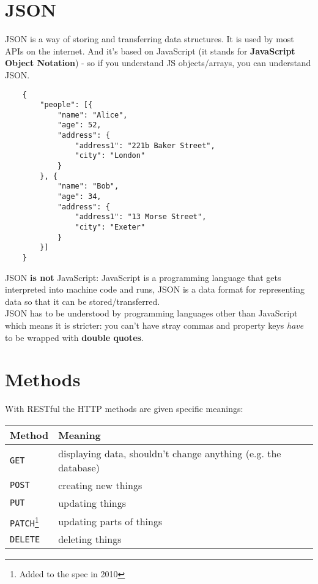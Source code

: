 \section{JSON}

JSON is a way of storing and transferring data structures. It is used by most APIs on the internet. And it's based on JavaScript (it stands for \textbf{JavaScript Object Notation}) - so if you understand JS objects/arrays, you can understand JSON.

\begin{verbatim}
    {
        "people": [{
            "name": "Alice",
            "age": 52,
            "address": {
                "address1": "221b Baker Street",
                "city": "London"
            }
        }, {
            "name": "Bob",
            "age": 34,
            "address": {
                "address1": "13 Morse Street",
                "city": "Exeter"
            }
        }]
    }
\end{verbatim}

JSON \textbf{is not} JavaScript: JavaScript is a programming language that gets interpreted into machine code and runs, JSON is a data format for representing data so that it can be stored/transferred.
\\

JSON has to be understood by programming languages other than JavaScript which means it is stricter: you can't have stray commas and property keys \textit{have} to be wrapped with \textbf{double quotes}.




\section{Methods}

With RESTful the HTTP methods are given specific meanings:
\\

\begin{tabu}{| l | X |}
    \hline
    \textbf{Method} & \textbf{Meaning} \\
    \hline
    \texttt{GET} & displaying data, shouldn't change anything (e.g. the database)\\
    \texttt{POST} & creating new things\\
    \texttt{PUT} & updating things\\
    \texttt{PATCH}\footnote{Added to the spec in 2010} & updating parts of things\\
    \texttt{DELETE} & deleting things\\
    \hline
\end{tabu}


